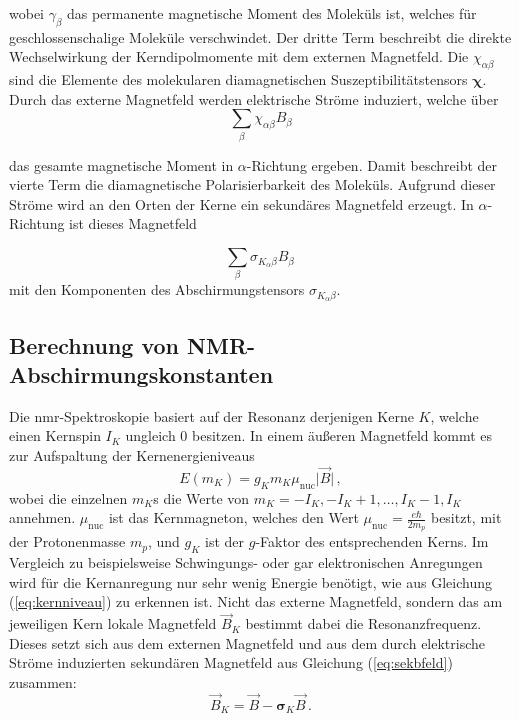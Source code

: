 wobei $\gamma_\beta$ das permanente magnetische Moment des Moleküls ist, welches für geschlossenschalige Moleküle verschwindet. Der dritte Term beschreibt die direkte Wechselwirkung der Kerndipolmomente mit dem externen Magnetfeld. Die $\chi_{\alpha\beta}$ sind die Elemente des molekularen diamagnetischen Suszeptibilitätstensors $\boldsymbol{\chi}$. Durch das externe Magnetfeld werden elektrische Ströme induziert, welche über 
\begin{equation}
\sum_{\beta}\chi_{\alpha\beta} B_\beta
\end{equation} 

das gesamte magnetische Moment in $\alpha$-Richtung ergeben. Damit beschreibt der vierte Term die diamagnetische Polarisierbarkeit des Moleküls. Aufgrund dieser Ströme wird an den Orten der Kerne ein sekundäres Magnetfeld erzeugt. In $\alpha$-Richtung ist dieses Magnetfeld

\begin{equation}\label{eq:sekbfeld}
\sum_{\beta}\sigma_{K_\alpha\beta} B_\beta\, 
\end{equation}
mit den Komponenten des Abschirmungstensors $\sigma_{K_\alpha\beta}$.

%

	\subsection{Berechnung von NMR-Abschirmungskonstanten}\label{theo:nmr}
	
Die \ac{nmr}-Spektroskopie basiert auf der Resonanz derjenigen Kerne $K$, welche einen Kernspin $I_K$ ungleich 0 besitzen. In einem äußeren Magnetfeld kommt es zur Aufspaltung der Kernenergieniveaus
\begin{equation}\label{eq:kernniveau}
  E({m_K})=g_Km_K\mu_{\textrm{nuc}}\vert\vec{B}\vert\, ,
\end{equation}	
wobei die einzelnen $m_K$s die Werte von $m_K=-I_K, -I_K+1, \dotsc ,I_K-1,I_K$ annehmen. $\mu_{\textrm{nuc}}$ ist das Kernmagneton, welches den Wert $\mu_{\textrm{nuc}}=\frac{e\hbar}{2m_p}$ besitzt, mit der Protonenmasse $m_p$, und $g_K$ ist der $g$-Faktor des entsprechenden Kerns. Im Vergleich zu beispielsweise Schwingungs- oder gar elektronischen Anregungen wird für die Kernanregung nur sehr wenig Energie benötigt, wie aus Gleichung (\ref{eq:kernniveau}) zu erkennen ist. Nicht das externe Magnetfeld, sondern das am jeweiligen Kern lokale Magnetfeld $\vec{B}_K$ bestimmt dabei die Resonanzfrequenz. Dieses setzt sich aus dem externen Magnetfeld und aus dem durch elektrische Ströme induzierten sekundären Magnetfeld aus Gleichung (\ref{eq:sekbfeld}) zusammen:
\begin{equation}
\vec{B}_K=\vec{B}-\boldsymbol{\sigma}_K\vec{B}\, .
\end{equation}


